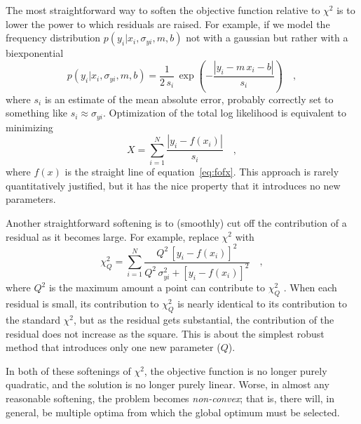 \documentclass[12pt,twoside]{article}
\newcommand{\equationname}{equation}
\newcounter{problem}
\begin{document}
The most straightforward way to soften the objective function relative
to $\chi^2$ is to lower the power to which residuals are raised.  For
example, if we model the frequency distribution
$p(y_i|x_i,\sigma_{yi},m,b)$ not with a gaussian but rather with a
biexponential
\begin{equation}
p(y_i|x_i,\sigma_{yi},m,b) = \frac{1}{2\,s_i}
 \,\exp\left(-\frac{|y_i-m\,x_i-b|}{s_i}\right) \quad ,
\end{equation}
where $s_i$ is an estimate of the mean absolute error, probably
correctly set to something like $s_i\approx \sigma_{yi}$.
Optimization of the total log likelihood is equivalent to minimizing
\begin{equation}\label{eq:biexp}
X = \sum_{i=1}^N \frac{|y_i-f(x_i)|}{s_i} \quad ,
\end{equation}
where $f(x)$ is the straight line of \equationname~\ref{eq:fofx}.
This approach is rarely quantitatively justified, but it has the nice
property that it introduces no new parameters.

Another straightforward softening is to (smoothly) cut off the
contribution of a residual as it becomes large.  For example, replace
$\chi^2$ with
\begin{equation}\label{eq:soft}
\chi_Q^2 = \sum_{i=1}^N \frac{Q^2\,[y_i-f(x_i)]^2}
  {Q^2\,\sigma_{yi}^2+[y_i-f(x_i)]^2} \quad ,
\end{equation}
where $Q^2$ is the maximum amount a point can contribute to $\chi_Q^2$
 \citep{hampel}.  When each residual is small, its
contribution to $\chi_Q^2$ is nearly identical to its contribution to
the standard $\chi^2$, but as the residual gets substantial, the
contribution of the residual does not increase as the square.  This is
about the simplest robust method that introduces only one new
parameter ($Q$).

In both of these softenings of $\chi^2$, the objective function is no
longer purely quadratic, and the solution is no longer purely linear.
Worse, in almost any reasonable softening, the problem becomes
\emph{non-convex}; that is, there will, in general, be multiple optima
from which the global optimum must be selected.
\end{document}
